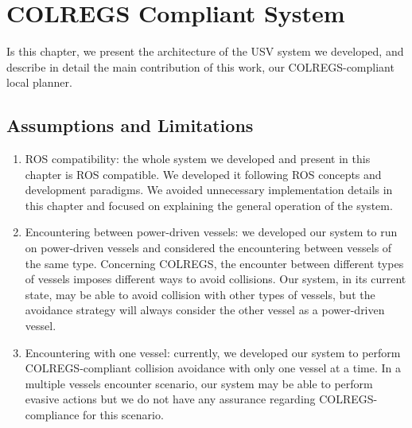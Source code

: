 \chapter{COLREGS Compliant System}
\label{chap:4_COLREGS_Compliant_Guidance_System}

    Is this chapter, we present the architecture of the \ac{USV} system we developed, and describe in detail the main contribution of this work, our COLREGS-compliant local planner. 

\section{Assumptions and Limitations}
\label{sec:assum_and_limits}


    \begin{enumerate}
        
        \item \ac{ROS} compatibility: the whole system we developed and present in this chapter is ROS compatible. We developed it following \ac{ROS} concepts and development paradigms. We avoided unnecessary implementation details in this chapter and focused on explaining the general operation of the system. %
        
        \item Encountering between power-driven vessels: we developed our system to run on power-driven vessels and considered the encountering between vessels of the same type. Concerning COLREGS, the encounter between different types of vessels imposes different ways to avoid collisions. Our system, in its current state, may be able to avoid collision with other types of vessels, but the avoidance strategy will always consider the other vessel as a power-driven vessel.

        \item Encountering with one vessel: currently, we developed our system to perform COLREGS-compliant collision avoidance with only one vessel at a time. In a multiple vessels encounter scenario, our system may be able to perform evasive actions but we do not have any assurance regarding COLREGS-compliance for this scenario.

    \end{enumerate}

